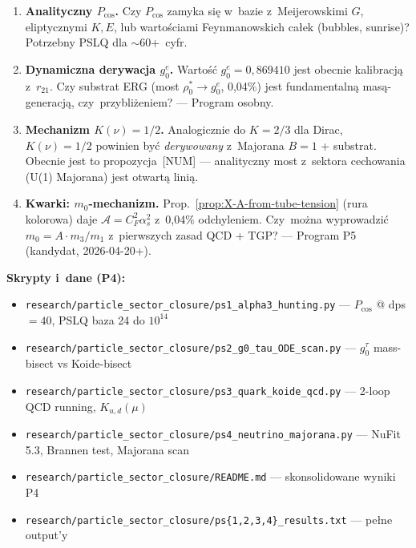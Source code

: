 \begin{enumerate}[nosep]
  \item \textbf{Analityczny $P_{\cos}$.} Czy $P_{\cos}$ zamyka si\k{e}
    w~bazie z~Meijerowskimi $G$, eliptycznymi $K, E$, lub warto\'sciami
    Feynmanowskich ca\l{}ek (bubbles, sunrise)? Potrzebny PSLQ dla
    $\sim 60$+~cyfr.
  \item \textbf{Dynamiczna derywacja $g_0^e$.} Warto\'s\'c $g_0^e=0{,}869410$
    jest obecnie kalibracj\k{a} z~$r_{21}$. Czy substrat ERG
    (most $\rho_0^* \to g_0^e$, 0{,}04\%) jest fundamentaln\k{a}
    mas\k{a}-generacj\k{a}, czy~przybli\.zeniem? --- Program osobny.
  \item \textbf{Mechanizm $K(\nu)=1/2$.} Analogicznie do $K=2/3$ dla Dirac,
    $K(\nu)=1/2$ powinien by\'c \emph{derywowany} z~Majorana $B=1$ + substrat.
    Obecnie jest to propozycja~[NUM] --- analityczny most z~sektora
    cechowania (U(1) Majorana) jest otwart\k{a} lini\k{a}.
  \item \textbf{Kwarki: $m_0$-mechanizm.}
    Prop.~\ref{prop:X-A-from-tube-tension} (rura kolorowa) daje
    $\mathcal{A}=C_F^2\alpha_s^2$ z~0{,}04\% odchyleniem. Czy~mo\.zna
    wyprowadzi\'c $m_0 = A\cdot m_3/m_1$ z~pierwszych zasad QCD + TGP?
    --- Program P5 (kandydat, 2026-04-20+).
\end{enumerate}

\medskip
\textbf{Skrypty i~dane (P4):}
\begin{itemize}[nosep]
\item \texttt{research/particle\_sector\_closure/ps1\_alpha3\_hunting.py} --- $P_{\cos}$ @ dps$=40$, PSLQ baza 24 do $10^{14}$
\item \texttt{research/particle\_sector\_closure/ps2\_g0\_tau\_ODE\_scan.py} --- $g_0^\tau$ mass-bisect vs Koide-bisect
\item \texttt{research/particle\_sector\_closure/ps3\_quark\_koide\_qcd.py} --- 2-loop QCD running, $K_{u,d}(\mu)$
\item \texttt{research/particle\_sector\_closure/ps4\_neutrino\_majorana.py} --- NuFit 5.3, Brannen test, Majorana scan
\item \texttt{research/particle\_sector\_closure/README.md} --- skonsolidowane wyniki P4
\item \texttt{research/particle\_sector\_closure/ps\{1,2,3,4\}\_results.txt} --- pe\l{}ne output'y
\end{itemize}
